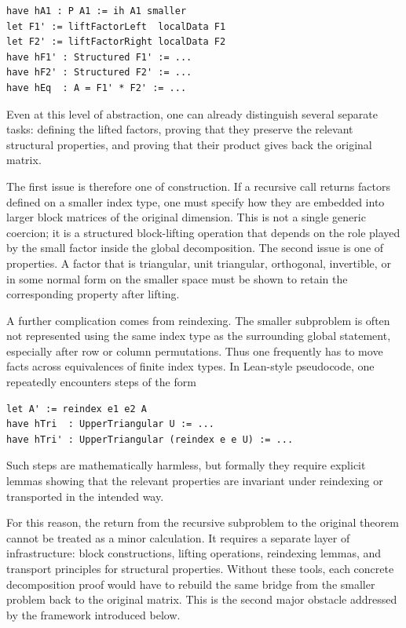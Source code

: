 \documentclass[pdflatex,sn-mathphys-num]{sn-jnl}%
\theoremstyle{thmstyleone}%
\theoremstyle{thmstyletwo}%
\theoremstyle{thmstylethree}%
\begin{document}
\begin{lstlisting}
have hA1 : P A1 := ih A1 smaller
let F1' := liftFactorLeft  localData F1
let F2' := liftFactorRight localData F2
have hF1' : Structured F1' := ...
have hF2' : Structured F2' := ...
have hEq  : A = F1' * F2' := ...
\end{lstlisting}

Even at this level of abstraction, one can already distinguish several separate tasks: defining the lifted factors, proving that they preserve the relevant structural properties, and proving that their product gives back the original matrix.

The first issue is therefore one of construction. If a recursive call returns factors defined on a smaller index type, one must specify how they are embedded into larger block matrices of the original dimension. This is not a single generic coercion; it is a structured block-lifting operation that depends on the role played by the small factor inside the global decomposition. The second issue is one of properties. A factor that is triangular, unit triangular, orthogonal, invertible, or in some normal form on the smaller space must be shown to retain the corresponding property after lifting.

A further complication comes from reindexing. The smaller subproblem is often not represented using the same index type as the surrounding global statement, especially after row or column permutations. Thus one frequently has to move facts across equivalences of finite index types. In Lean-style pseudocode, one repeatedly encounters steps of the form

\begin{lstlisting}
let A' := reindex e1 e2 A
have hTri  : UpperTriangular U := ...
have hTri' : UpperTriangular (reindex e e U) := ...
\end{lstlisting}

Such steps are mathematically harmless, but formally they require explicit lemmas showing that the relevant properties are invariant under reindexing or transported in the intended way.

For this reason, the return from the recursive subproblem to the original theorem cannot be treated as a minor calculation. It requires a separate layer of infrastructure: block constructions, lifting operations, reindexing lemmas, and transport principles for structural properties. Without these tools, each concrete decomposition proof would have to rebuild the same bridge from the smaller problem back to the original matrix. This is the second major obstacle addressed by the framework introduced below.
\end{document}
